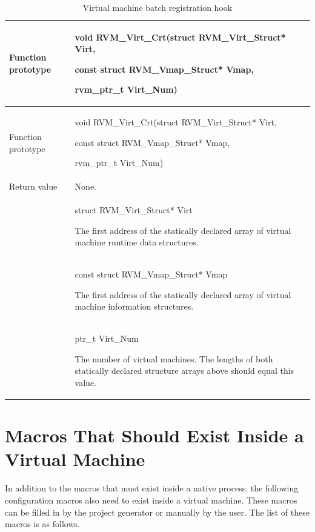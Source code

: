 \begin{xltabular}{\textwidth}{@{}>{\hsize\raggedright\arraybackslash}X>{\hsize\raggedright\arraybackslash}X@{}}
\caption{Virtual machine batch registration hook}\label{tab:4-2}\\
\toprule
Function prototype\strut
 & void RVM\_\allowbreak{}Virt\_\allowbreak{}Crt(struct RVM\_\allowbreak{}Virt\_\allowbreak{}Struct* Virt,

const struct RVM\_\allowbreak{}Vmap\_\allowbreak{}Struct* Vmap,

rvm\_\allowbreak{}ptr\_\allowbreak{}t Virt\_\allowbreak{}Num)\strut
\tabularnewline
\endfirsthead
\toprule
Function prototype\strut
 & void RVM\_\allowbreak{}Virt\_\allowbreak{}Crt(struct RVM\_\allowbreak{}Virt\_\allowbreak{}Struct* Virt,

const struct RVM\_\allowbreak{}Vmap\_\allowbreak{}Struct* Vmap,

rvm\_\allowbreak{}ptr\_\allowbreak{}t Virt\_\allowbreak{}Num)\strut
\tabularnewline
\midrule
\endhead
\bottomrule
\endlastfoot
Return value & None.\tabularnewline
{} & struct RVM\_\allowbreak{}Virt\_\allowbreak{}Struct* Virt

The first address of the statically declared array of virtual machine runtime data structures.\strut
\tabularnewline
\strut
 & const struct RVM\_\allowbreak{}Vmap\_\allowbreak{}Struct* Vmap

The first address of the statically declared array of virtual machine information structures.\strut
\tabularnewline
\strut
 & ptr\_\allowbreak{}t Virt\_\allowbreak{}Num

The number of virtual machines. The lengths of both statically declared structure arrays above should equal this value.\strut
\tabularnewline
\end{xltabular}

\section{Macros That Should Exist Inside a Virtual Machine}\label{sec:4-3}

In addition to the macros that must exist inside a native process, the following configuration macros also need to exist inside a virtual machine. These macros can be filled in by the project generator or manually by the user. The list of these macros is as follows.

